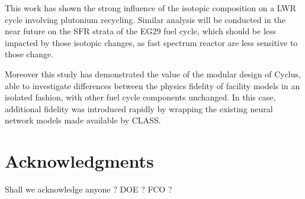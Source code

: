 \documentclass{anstrans}
\begin{document}
This work has shown the strong influence of the isotopic composition on a LWR
cycle involving plutonium recycling. Similar analysis will be conducted in the
near future on the SFR strata of the EG29 fuel cycle, which should be less
impacted by those isotopic changes, as fast spectrum reactor are less sensitive
to those change.

Moreover this study has demonstrated the value of the modular design of
Cyclus, able to investigate differences between the physics fidelity of
facility models in an isolated fashion, with other fuel cycle components
unchanged.  In this case, additional fidelity was introduced rapidly by
wrapping the existing neural network models made available by CLASS.



%

\section{Acknowledgments}
Shall we acknowledge anyone ? DOE ? FCO ?




\end{document}
